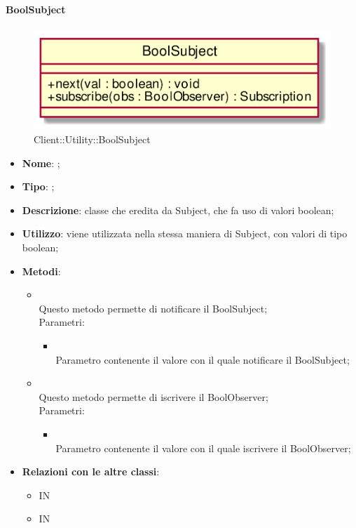 \hypertarget{BoolSubject_label}{\paragraph{BoolSubject}}
\begin{figure}[h]
	\centering
	\includegraphics[width=\textwidth,height=\textheight,keepaspectratio]{images/ClassBoolSubject.png}
	\caption{Client::Utility::BoolSubject}
\end{figure}
\begin{itemize}
	\item \textbf{Nome}: ;
	\item \textbf{Tipo}: ;
	\item \textbf{Descrizione}: classe che eredita da Subject, che fa uso di valori boolean;
	\item \textbf{Utilizzo}: viene utilizzata nella stessa maniera di Subject, con valori di tipo boolean;
	\item \textbf{Metodi}:
	\begin{itemize}
		\item[]  \\
		Questo metodo permette di notificare il BoolSubject;\\
		Parametri:
		\begin{itemize}
			\item {} \\
			Parametro contenente il valore con il quale notificare il BoolSubject;
		\end{itemize}
		\item[]  \\
		Questo metodo permette di iscrivere il BoolObserver;\\
		Parametri:
		\begin{itemize}
			\item {} \\
			Parametro contenente il valore con il quale iscrivere il BoolObserver;
		\end{itemize}
	\end{itemize}
	\item \textbf{Relazioni con le altre classi}:
	\begin{itemize}
		\item IN \hyperlink{Player_label}{}
		\item IN \hyperlink{BoolObservable_label}{}
	\end{itemize}
\end{itemize}


